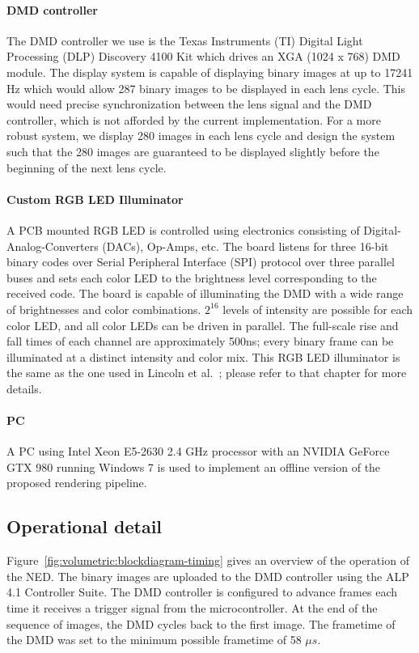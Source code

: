 \paragraph{DMD controller} 
The DMD controller we use is the Texas Instruments (TI) Digital Light Processing (DLP) Discovery 4100 Kit which drives an XGA (1024 x 768) DMD module. The display system is capable of displaying binary images at up to 17241 Hz which would allow 287 binary images to be displayed in each lens cycle. This would need precise synchronization between the lens signal and the DMD controller, which is not afforded by the current implementation. For a more robust system, we display 280 images in each lens cycle and design the system such that the 280 images are guaranteed to be displayed slightly before the beginning of the next lens cycle. 

\paragraph{Custom RGB LED Illuminator}
A PCB mounted RGB LED is controlled using electronics consisting of Digital-Analog-Converters (DACs), Op-Amps, etc. The board listens for three 16-bit binary codes over Serial Peripheral Interface (SPI) protocol over three parallel buses and sets each color LED to the brightness level corresponding to the received code. The board is capable of illuminating the DMD with a wide range of brightnesses and color combinations. $2^{16}$ levels of intensity are possible for each color LED, and all color LEDs can be driven in parallel. The full-scale rise and fall times of each channel are approximately 500ns; every binary frame can be illuminated at a distinct intensity and color mix. This RGB LED illuminator is the same as the one used in Lincoln et al.~\cite{Lincoln2017scene}; please refer to that chapter for more details. 

\paragraph{PC}
A PC using Intel Xeon E5-2630 2.4 GHz processor with an NVIDIA GeForce GTX 980 running Windows 7 is used to implement an offline version of the proposed rendering pipeline. 


\subsection{Operational detail}
Figure~\ref{fig:volumetric:blockdiagram-timing} gives an overview of the operation of the NED. The binary images are uploaded to the DMD controller using the ALP 4.1 Controller Suite. The DMD controller is configured to advance frames each time it receives a trigger signal from the microcontroller. At the end of the sequence of images, the DMD cycles back to the first image. The frametime of the DMD was set to the minimum possible frametime of 58 $\mu s$.

